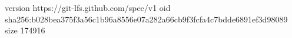version https://git-lfs.github.com/spec/v1
oid sha256:b028bea375f3a56c1b96a8556e07a282a66cb9f3fcfa4c7bdde6891ef3d98089
size 174916
